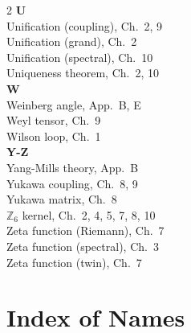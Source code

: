 \documentclass[11pt,a4paper,openright]{book}
\theoremstyle{plain}
\theoremstyle{definition}
\begin{document}
\begin{multicols}{2}
\textbf{U}\\[2pt]
Unification (coupling), Ch.~2, 9\\
Unification (grand), Ch.~2\\
Unification (spectral), Ch.~10\\
Uniqueness theorem, Ch.~2, 10\\[4pt]

\textbf{W}\\[2pt]
Weinberg angle, App.~B, E\\
Weyl tensor, Ch.~9\\
Wilson loop, Ch.~1\\[4pt]

\textbf{Y-Z}\\[2pt]
Yang-Mills theory, App.~B\\
Yukawa coupling, Ch.~8, 9\\
Yukawa matrix, Ch.~8\\
$\mathbb{Z}_6$ kernel, Ch.~2, 4, 5, 7, 8, 10\\
Zeta function (Riemann), Ch.~7\\
Zeta function (spectral), Ch.~3\\
Zeta function (twin), Ch.~7\\

\end{multicols}

\newpage

\chapter*{Index of Names}
\end{document}
